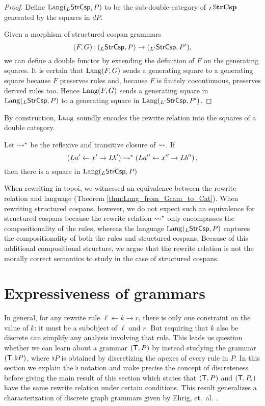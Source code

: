 \documentclass{amsart}
\begin{document}
\begin{proof}
  Define $\mathrm{Lang} (_L\mathsf{StrCsp},P)$ to be the
  sub-double-category of $_L\mathbb{S} \mathbf{trCsp}$ generated
  by the squares in $dP$.
  
  Given a morphism of structured cospan grammars
  $$(F,G) \colon (_L\mathsf{StrCsp},P) \to (_{L'}\mathsf{StrCsp},P'),$$ we
  can define a double functor by extending the definition of
  $F$ on the generating squares. It is certain that
  $\mathrm{Lang} (F,G)$ sends a generating square to a generating
  square because $F$ preserves rules and, because $F$ is
  finitely cocontinuous, preserves derived rules too.  Hence
  $\mathrm{Lang} (F,G)$ sends a generating square in
  $\mathrm{Lang} (_{L}\mathsf{StrCsp},P)$ to a generating square in
  $\mathrm{Lang} (_{L'}\mathsf{StrCsp},P')$.
\end{proof}

By construction, $ \mathrm{Lang} $ soundly
encodes the rewrite relation into the squares of a
double category.

\begin{corollary}
  \label{thm:StrCspLang_Encodes_RewrRel}
  Let $ \rightsquigarrow^\ast $ be the reflexive and
  transitive closure of $ \rightsquigarrow $.  If
  $$ \left(La' \leftarrow x' \to Lb'\right) \rightsquigarrow^\ast \left(La'' \leftarrow x'' \to Lb''\right), $$ then there is a square
   in
  $ \mathrm{Lang} ({}_L\mathsf{StrCsp}, P) $
\end{corollary}

When rewriting in topoi, we witnessed an
equivalence between the rewrite relation and
language (Theorem
\ref{thm:Lang_from_Gram_to_Cat}). When rewriting
structured cospans, however, we do not expect such
an equivalence for structured cospans because the
rewrite relation $ \rightsquigarrow^\ast $ only encompasses
the compositionality of the rules, whereas the
language $ \mathrm{Lang} (_L\mathsf{StrCsp},P) $ captures the
compositionality of both the rules and structured
cospans. Because of this additional compositional
structure, we argue that the rewrite relation is
not the morally correct semantics to study in the
case of structured cospans. 

\section{Expressiveness of grammars}
\label{sec:gen-result-graph-rewriting}

In general, for any rewrite rule
$ \ell \gets k \to r $, there is only one
constraint on the value of $ k $: it must be a
subobject of $ \ell $ and $ r $.  But requiring
that $ k $ also be discrete can simplify
any analysis involving that rule. This leads us
question whether we can learn about a grammar
$ ( \mathsf{T},P ) $ by instead studying the grammar
$ ( \mathsf{T}, \flat P ) $, where $ \flat P $ is obtained
by discretizing the apexes of every rule in $ P
$. In this section we explain the $ \flat $
notation and make precise the concept of
discreteness before giving the main result of this
section which states that $ ( \mathsf{T},P ) $ and
$ ( \mathsf{T}, P_\flat  ) $ have the same rewrite relation
under certain conditions.  This result generalizes
a characterization of discrete graph grammars
given by Ehrig,
et.~al. \cite[Prop.~3.3]{Ehrig_GraphGram}.
\end{document}
